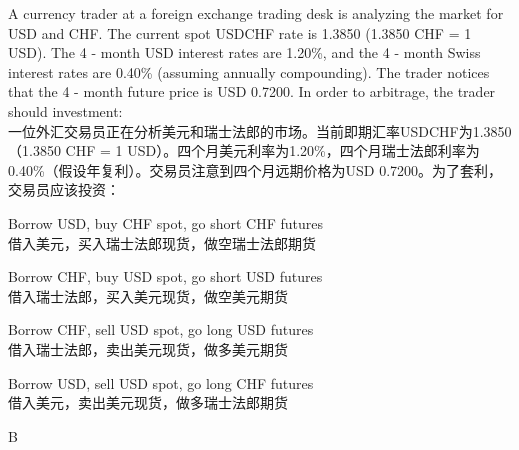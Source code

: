 \documentclass{article}
\newcounter{question} %
\begin{document}
\begin{question}
    A currency trader at a foreign exchange trading desk is analyzing the market for USD and CHF. The current spot USDCHF rate is 1.3850 (1.3850 CHF = 1 USD). The 4 - month USD interest rates are 1.20\%, and the 4 - month Swiss interest rates are 0.40\% (assuming annually compounding). The trader notices that the 4 - month future price is USD 0.7200. In order to arbitrage, the trader should investment:\\
    一位外汇交易员正在分析美元和瑞士法郎的市场。当前即期汇率USDCHF为1.3850（1.3850 CHF = 1 USD）。四个月美元利率为1.20\%，四个月瑞士法郎利率为0.40\%（假设年复利）。交易员注意到四个月远期价格为USD 0.7200。为了套利，交易员应该投资：
    \end{question}
    
    \begin{choices}
        \item Borrow USD, buy CHF spot, go short CHF futures\\
        借入美元，买入瑞士法郎现货，做空瑞士法郎期货
        \item Borrow CHF, buy USD spot, go short USD futures\\
        借入瑞士法郎，买入美元现货，做空美元期货
        \item Borrow CHF, sell USD spot, go long USD futures\\
        借入瑞士法郎，卖出美元现货，做多美元期货
        \item Borrow USD, sell USD spot, go long CHF futures\\
        借入美元，卖出美元现货，做多瑞士法郎期货
    \end{choices}
    
    \begin{correctanswer}
        B
    \end{correctanswer}
    
\end{document}
